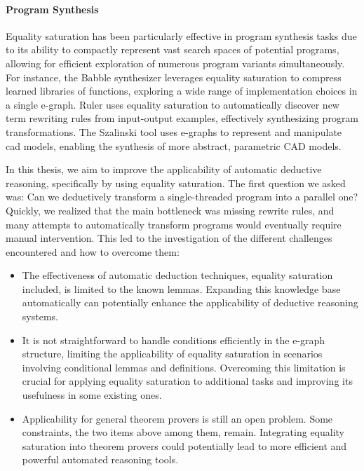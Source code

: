 \paragraph{Program Synthesis} Equality saturation has been particularly effective in program synthesis tasks due to its ability to compactly represent vast search spaces of potential programs, allowing for efficient exploration of numerous program variants simultaneously.
For instance, the Babble synthesizer \cite{cao2023babble} leverages equality saturation to compress learned libraries of functions, exploring a wide range of implementation choices in a single e-graph. 
Ruler \cite{ruler} uses equality saturation to automatically discover new term rewriting rules from input-output examples, effectively synthesizing program transformations.
The Szalinski tool \cite{nandi2020synthesizing} uses e-graphs to represent and manipulate \gls{cad} models, enabling the synthesis of more abstract, parametric CAD models.

\bigskip

In this thesis, we aim to improve the applicability of automatic deductive reasoning, specifically by using equality saturation.
The first question we asked was: Can we deductively transform a single-threaded program into a parallel one?
Quickly, we realized that the main bottleneck was missing rewrite rules, and many attempts to automatically transform programs would eventually require manual intervention.
This led to the investigation of the different challenges encountered and how to overcome them:

\begin{itemize}
    \item  The effectiveness of automatic deduction techniques, equality saturation included, is limited to the known lemmas.
    Expanding this knowledge base automatically can potentially enhance the applicability of deductive reasoning systems.
    \item It is not straightforward to handle conditions efficiently in the e-graph structure, limiting the applicability of equality saturation in scenarios involving conditional lemmas and definitions. 
    Overcoming this limitation is crucial for applying equality saturation to additional tasks and improving its usefulness in some existing ones.
    \item Applicability for general theorem provers is still an open problem. 
    Some constraints, the two items above among them, remain.
    Integrating equality saturation into theorem provers could potentially lead to more efficient and powerful automated reasoning tools.
\end{itemize}


